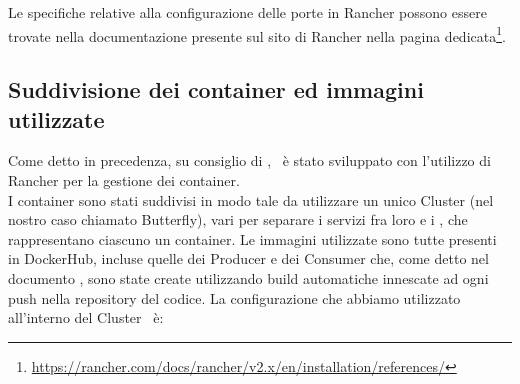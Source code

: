 Le specifiche relative alla configurazione delle porte in Rancher possono essere trovate nella documentazione presente sul sito di Rancher nella pagina dedicata\footnote{\url{https://rancher.com/docs/rancher/v2.x/en/installation/references/}}.

\subsection{Suddivisione dei container ed immagini utilizzate}
Come detto in precedenza, su consiglio di \II, \progetto\ è stato sviluppato con l'utilizzo di Rancher per la gestione dei container.\\
I container sono stati suddivisi in modo tale da utilizzare un unico Cluster (nel nostro caso chiamato Butterfly), vari  per separare i servizi fra loro e i , che rappresentano ciascuno un container.
Le immagini utilizzate sono tutte presenti in DockerHub, incluse quelle dei Producer e dei Consumer che, come detto nel documento \NdPd, sono state create utilizzando build automatiche innescate ad ogni push nella repository del codice.
\newpage
La configurazione che abbiamo utilizzato all'interno del Cluster \progetto\ è:
